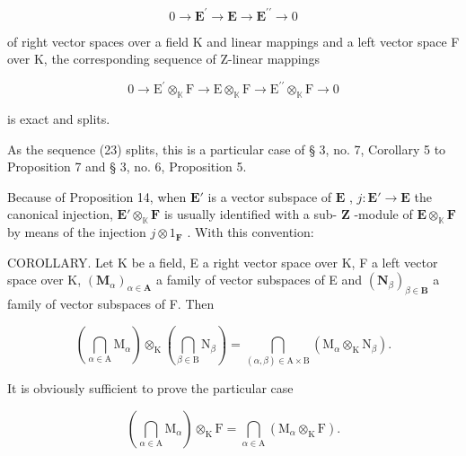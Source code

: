 \[
0 \rightarrow \mathbf {E} ^ {\prime} \rightarrow \mathbf {E} \rightarrow \mathbf {E} ^ {\prime \prime} \rightarrow 0\tag{23}
\]

of right vector spaces over a field K and linear mappings and a left vector space F over K, the corresponding sequence of Z-linear mappings

\[
0 \rightarrow \mathrm{E} ^ {\prime} \otimes_ {\mathbb {K}} \mathrm{F} \rightarrow \mathrm{E} \otimes_ {\mathbb {K}} \mathrm{F} \rightarrow \mathrm{E} ^ {\prime \prime} \otimes_ {\mathbb {K}} \mathrm{F} \rightarrow 0
\]

is exact and splits.

As the sequence (23) splits, this is a particular case of § 3, no. 7, Corollary 5 to Proposition 7 and § 3, no. 6, Proposition 5.

Because of Proposition 14, when \(\mathbf{E}'\) is a vector subspace of \(\mathbf{E}\) , \(j: \mathbf{E}' \to \mathbf{E}\) the canonical injection, \(\mathbf{E}' \otimes_{\mathbb{K}} \mathbf{F}\) is usually identified with a sub- \(\mathbf{Z}\) -module of \(\mathbf{E} \otimes_{\mathbb{K}} \mathbf{F}\) by means of the injection \(j \otimes 1_{\mathbf{F}}\) . With this convention:

COROLLARY. Let K be a field, E a right vector space over K, F a left vector space over K, \((\mathbf{M}_{\alpha})_{\alpha \in \mathbf{A}}\) a family of vector subspaces of E and \((\mathbf{N}_{\beta})_{\beta \in \mathbf{B}}\) a family of vector subspaces of F. Then

\[
\left(\bigcap_ {\alpha \in \mathrm{A}} \mathrm{M} _ {\alpha}\right) \otimes_ {\mathrm{K}} \left(\bigcap_ {\beta \in \mathrm{B}} \mathrm{N} _ {\beta}\right) = \bigcap_ {(\alpha , \beta) \in \mathrm{A} \times \mathrm{B}} \left(\mathrm{M} _ {\alpha} \otimes_ {\mathrm{K}} \mathrm{N} _ {\beta}\right).\tag{24}
\]

It is obviously sufficient to prove the particular case

\[
\left(\bigcap_ {\alpha \in \mathrm{A}} \mathrm{M} _ {\alpha}\right) \otimes_ {\mathrm{K}} \mathrm{F} = \bigcap_ {\alpha \in \mathrm{A}} \left(\mathrm{M} _ {\alpha} \otimes_ {\mathrm{K}} \mathrm{F}\right).\tag{25}
\]

